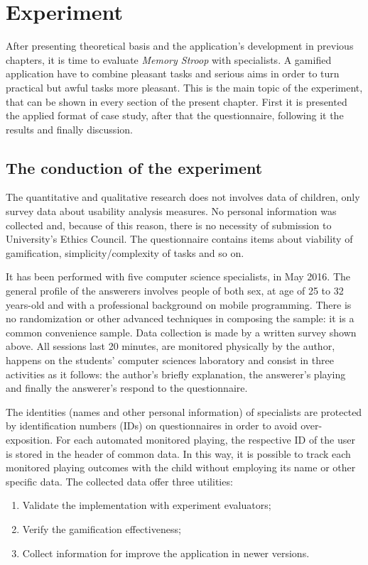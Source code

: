 \chapter{Experiment}
\label{ch:experiment}

After presenting theoretical basis and the application's development in previous chapters, it is time to evaluate \textit{Memory Stroop} with specialists. A gamified application have to combine pleasant tasks and serious aims in order to turn practical but awful tasks more pleasant. This is the main topic of the experiment, that can be shown in every section of the present chapter. First it is presented the applied format of case study, after that the questionnaire, following it the results and finally discussion.

\section{The conduction of the experiment}

The quantitative and qualitative research does not involves data of children, only survey data about usability analysis measures. No personal information was collected and, because of this reason, there is no necessity of submission to University's Ethics Council. The questionnaire contains items about viability of gamification, simplicity/complexity of tasks and so on.
	
It has been performed with five computer science specialists, in May 2016. The general profile of the answerers involves people of both sex, at age of 25 to 32 years-old and with a professional background on mobile programming. There is no randomization or other advanced techniques in composing the sample: it is a common convenience sample. Data collection is made by a written survey shown  above. All sessions last 20 minutes, are monitored physically by the author, happens on the students' computer sciences laboratory and consist in three activities as it follows: the author's briefly explanation, the answerer's playing and finally the answerer's respond to the questionnaire. 

The identities (names and other personal information) of specialists are	 protected by identification numbers (IDs) on questionnaires in order to avoid over-exposition. For each automated monitored playing, the respective ID of the user is stored in the header of common data. In this way, it is possible to track each monitored playing outcomes with the child without employing its name or other specific data. The collected data offer three utilities: 
\begin{enumerate}
\item Validate the implementation with experiment evaluators;
\item Verify the gamification effectiveness;
\item Collect information for improve the application in newer versions.
\end{enumerate} 


